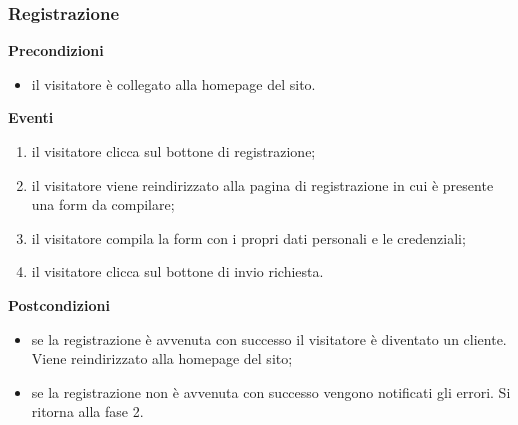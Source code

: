 \documentclass[a4paper, 14pt]{article}
\begin{document}
\begin{flushleft}
			\subsubsection{Registrazione}
				\textbf{Precondizioni}
				\begin{itemize}
					\item il visitatore è collegato alla homepage del sito.
				\end{itemize}
				\textbf{Eventi}
				\begin{enumerate}
					\item il visitatore clicca sul bottone di registrazione;
					\item il visitatore viene reindirizzato alla pagina di registrazione in cui è presente una form da compilare;
					\item il visitatore compila la form con i propri dati personali e le credenziali;
					\item il visitatore clicca sul bottone di invio richiesta.
				\end{enumerate}
				\textbf{Postcondizioni}
				\begin{itemize}
					\item se la registrazione è avvenuta con successo il visitatore è diventato un cliente. Viene reindirizzato alla homepage del sito;
					\item se la registrazione non è avvenuta con successo vengono notificati gli errori. Si ritorna alla fase 2.
				\end{itemize}
			
			
			\bigskip

\end{flushleft}
\end{document}
